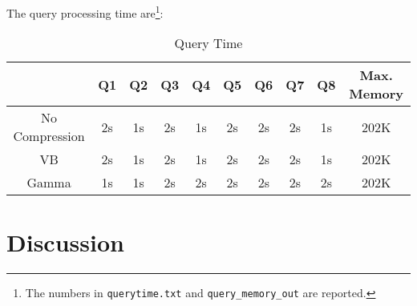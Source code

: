 \documentclass{article}
\begin{document}
The query processing time are{\footnote{The numbers in {\texttt{querytime.txt}}
and {\texttt{query\_memory\_out}} are reported.}}:

\begin{table}[h]
  \begin{tabular}{|c|c|c|c|c|c|c|c|c|c|}
    \hline
    & Q1 & Q2 & Q3 & Q4 & Q5 & Q6 & Q7 & Q8 & Max. Memory\\
    \hline
    No Compression & 2s & 1s & 2s & 1s & 2s & 2s & 2s & 1s & 202K\\
    \hline
    VB & 2s & 1s & 2s & 1s & 2s & 2s & 2s & 1s & 202K\\
    \hline
    Gamma & 1s & 1s & 2s & 2s & 2s & 2s & 2s & 2s & 202K\\
    \hline
  \end{tabular}
  \caption{Query Time}
\end{table}

\section{Discussion}
\end{document}
